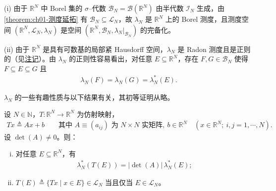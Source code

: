 \documentclass[../../main.tex]{subfiles}%
\begin{document}
\begin{remark}\label{remark:ch01-Lebesgue性质}
(i) 由于 $\mathbb{R}^N$ 中 Borel 集的 $\sigma$--代数 $\mathcal{B}_N=\mathcal{B}(\mathbb{R}^N)$ 由半代数 $\mathcal{I}_N$ 生成，由\cref{theorem:ch01-测度延拓} 有 $\mathcal{B}_N\subseteq\mathcal{L}_N$，故 $\lambda_N$ 是 $\mathbb{R}^N$ 上的 Borel 测度，且测度空间 $(\mathbb{R}^N,\mathcal{L}_N,\lambda_N)$ 是空间 $(\mathbb{R}^N,\mathcal{B}_N,\lambda_N|_{\mathcal{B}_N})$ 的完备化。

(ii) 由于 $\mathbb{R}^N$ 是具有可数基的局部紧 Hausdorff 空间，$\lambda_N$ 是 Radon 测度且是正则的（见\hyperref[remark:ch01-BorelRadon一致]{注记}）。由 $\lambda_N$ 的正则性容易看出，对任意 $E\subseteq\mathbb{R}^N$，存在 $F,G\in\mathcal{B}_N$ 使得 $F\subseteq E\subseteq G$ 且
\begin{align*}
\lambda_N(F)=\lambda_N(G)=\lambda_N^*(E).
\end{align*}
\end{remark}

$\lambda_N$ 的一些有趣性质与以下结果有关，其初等证明从略。

\begin{proposition}\label{proposition:ch01-仿射变换}
设 $N\in\mathbb{N}$，$T:\mathbb{R}^N\to\mathbb{R}^N$ 为仿射映射，
\begin{align*}
Tx\triangleq Ax+b\qquad\text{其中 }A\equiv(a_{ij})\text{ 为 }N\times N\text{ 实矩阵},\ b\in\mathbb{R}^N\quad(x\in\mathbb{R}^N;\ i,j=1,\cdots ,N).
\end{align*}
设 $\det(A)\neq0$。则：
\begin{enumerate}[(i)]
\item 对任意 $E\subseteq\mathbb{R}^N$，有
\begin{align*}
\lambda_N^*(T(E))=|\det(A)|\,\lambda_N^*(E);
\end{align*}
\item $T(E)\triangleq\{Tx\mid x\in E\}\in\mathcal{L}_N$ 当且仅当 $E\in\mathcal{L}_N$。
\end{enumerate}
\end{proposition}
\end{document}
